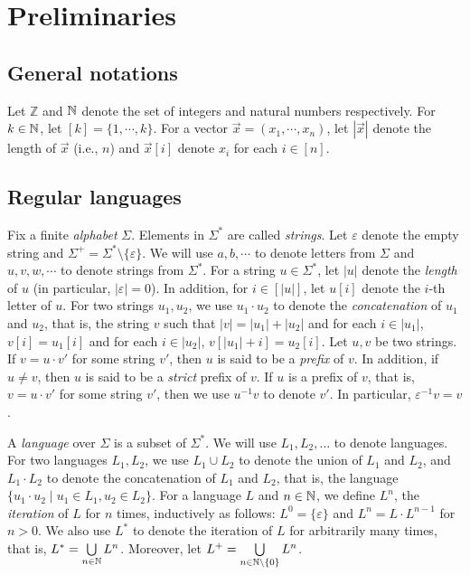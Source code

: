 
\section{Preliminaries}\label{sec-prel}

\subsection*{General notations} 
Let $\mathbb{Z}$ and $\mathbb{N}$ denote the set of integers and natural numbers respectively. For $k \in \mathbb{N}$, let $[k] = \{1,\cdots, k\}$. For a vector $\vec{x}=(x_1,\cdots, x_n)$, let $|\vec{x}|$ denote the length of $\vec{x}$ (i.e., $n$) and  $\vec{x}[i]$ denote $x_i$ for each $i \in [n]$. %


\subsection*{Regular languages}
Fix a finite \emph{alphabet} $\Sigma$. Elements in $\Sigma^*$ are called \emph{strings}. Let $\varepsilon$ denote the empty string and  $\Sigma^+ = \Sigma^* \setminus \{\varepsilon\}$. We will use $a,b,\cdots$ to denote letters from $\Sigma$ and $u, v, w, \cdots$ to denote strings from $\Sigma^*$. For a string $u \in \Sigma^*$, let $|u|$ denote the \emph{length} of $u$ (in particular, $|\varepsilon|=0$). In addition, for $i \in [|u|]$, let $u[i]$ denote the $i$-th letter of $u$. 
For two strings $u_1, u_2$, we use $u_1 \cdot u_2$ to denote the \emph{concatenation} of $u_1$ and $u_2$, that is, the string $v$ such that $|v|= |u_1| + |u_2|$ and for each $i \in |u_1|$, $v[i]= u_1[i]$ and for each $i \in |u_2|$, $v[|u_1|+i]=u_2[i]$. Let $u, v$ be two strings. If $v = u \cdot v'$ for some string $v'$, then $u$ is said to be a \emph{prefix} of $v$. In addition, if $u \neq v$, then $u$ is said to be a \emph{strict} prefix of $v$. If $u$ is a prefix of $v$, that is, $v = u \cdot v'$ for some string $v'$, then 
we use $u^{-1} v$ to denote $v'$. In particular, $\varepsilon^{-1} v = v$.

A \emph{language} over $\Sigma$ is a subset of $\Sigma^*$. We will use $L_1, L_2, \dots$ to denote languages. For two languages $L_1, L_2$, we use $L_1 \cup L_2$ to denote the union of $L_1$ and $L_2$, and $L_1 \cdot L_2$ to denote the concatenation of $L_1$ and $L_2$, that is, the language $\{u_1 \cdot u_2 \mid u_1 \in L_1, u_2 \in L_2\}$. For a language $L$ and $n \in \mathbb{N}$, we define $L^n$, the \emph{iteration} of $L$ for $n$ times, inductively as follows: $L^0=\{\varepsilon\}$ and $L^{n} =L \cdot L^{n-1}$ for $n > 0$. We also use $L^*$ to denote the iteration of $L$ for arbitrarily many times, that is, $L^* = \bigcup \limits_{n \in \mathbb{N}} L^n$. Moreover, let $L^+ = \bigcup \limits_{n \in \mathbb{N} \setminus \{0\}} L^n$.

